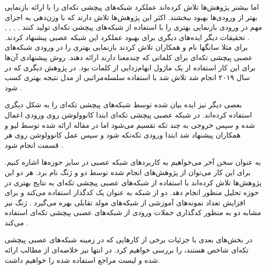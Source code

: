 اما بیشتر پژوهش‌ها تلاش کرده‌اند عملکرد شبکه‌های پیچشی تکه‌ای را با ارائه بازنمایی بهتر از ورودی‌ها بهبود
ببخشند. اکثر این پژوهش‌ها تلاش دارند که با وزن‌دهی به اجزای مهم در ورودی بازنمایی بهتری را با استفاده
از شبکه‌های پیچشی تکه‌ای تولید کنند \cite{nguyen-vietnamese}, \cite{agpcnn-xingya},
\cite{RCPNN-haihong}, \cite{Rusnachenko-opinion} \cite{Li2022}, \cite{gated}. تحقیقات دیگر ایده‌های دیگری برای بهبود عملکرد این شبکه
عصبی پیشنهاد کردند. برای مثلا سانگها نام و همکاران \cite{nam-etal-2018-distant} تلاش کردند
بازنمایی بهتری را در ورودی شبکه‌های عصبی پیچشی تکه‌ای برای کلماتی که چندمعنا دارند ارائه دهند. روش پیشنهادی
آن‌ها برای این کار استفاده از یک ماژول ابهام‌زدایی از کلمات بود. در پژوهش دیگری که در سال ۲۰۱۹ انجام شد
تلاش شد با استفاده سلسله‌مراتبی از مدل  نتیجه بهتری کسب شود \cite{diyah-adpcnn}.

بعضی دیگر نیز ایده بیان شده توسط شبکه‌های پیچشی تکه‌ای را به شکل دیگری استفاده کرده‌اند. در شبکه
عصبی پیچشی تکه‌ای ابتدا کانوولوشن روی ورودی اعمال شده و سپس خروجی به چند تکه تقسیم می‌شود
اما در مقاله ارائه شده توسط لیو و همکاران پیشنهاد شد ابتدا ورودی تکه‌تکه شود
و سپس عمل کانوولوشن روی هر قسمت انجام شود \cite{bert}.

به عنوان سخن آخر می‌خواهیم به کاربرد‌های شبکه عصبی  در سایز حوزه‌ها اشاره ‌کنیم.
برای این کار می‌توان از پژوهش‌های انجام شده توسط دو و ژنگ نام‌ برد.
هر دو این پژوهش‌ها تلاش کرده‌اند با استفاده از شبکه‌های عصبی پیچشی تکه‌ای به نتایج بهتری در حوزه
تحلیل منظور انجام دهد. دو از شبکه  به عنوان یک کدگذار
استفاده می‌کند و برای افزایش تعداد نمونه‌های آموزشی از شبکه‌های مولد تقابلی
بهره می‌گیرد \cite{sentiment-du}. ژنگ نیز مشابه دو به منظور کدگذاری جملات ورودی از شبکه‌های عصبی پیچشی تکه‌ای استفاده
می‌کند \cite{Zhang2018SentimentCB}.

در بخش‌های بعدی با جزئیات برخی از کار‌هایی که در زمینه شبکه‌های عصبی پیچشی تکه‌ای شاخص هستند، را بررسی خواهیم کرد.
در انتها نیز خلاصه‌ای از مطالب ارائه شده و لیست مراجع استفاده شده را خواهیم داشت.